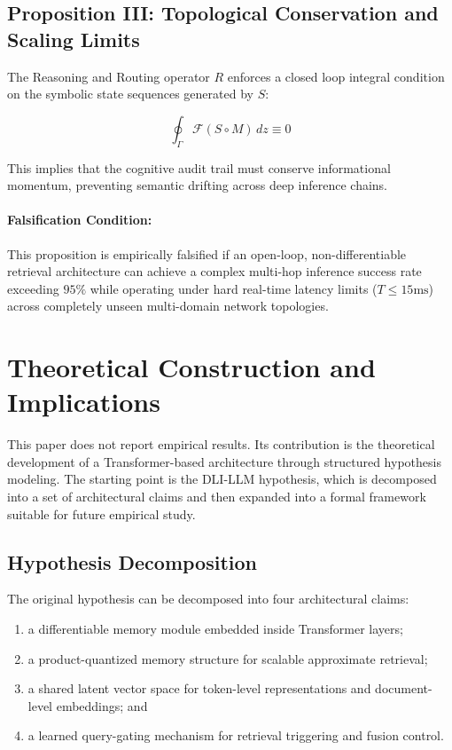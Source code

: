 \subsection{Proposition III: Topological Conservation and Scaling Limits}

The Reasoning and Routing operator $R$ enforces a closed loop integral condition on the symbolic state sequences generated by $S$:

\begin{equation}
\oint_{\Gamma} \mathcal{F}\left(S \circ M\right) \, dz \equiv 0
\end{equation}

This implies that the cognitive audit trail must conserve informational momentum, preventing semantic drifting across deep inference chains.
\paragraph{Falsification Condition:} This proposition is empirically falsified if an open-loop, non-differentiable retrieval architecture can achieve a complex multi-hop inference success rate exceeding $95\%$ while operating under hard real-time latency limits ($T \le 15\text{ms}$) across completely unseen multi-domain network topologies.

\section{Theoretical Construction and Implications}
This paper does not report empirical results. Its contribution is the theoretical development of a Transformer-based architecture through structured hypothesis modeling. The starting point is the DLI-LLM hypothesis, which is decomposed into a set of architectural claims and then expanded into a formal framework suitable for future empirical study.

\subsection{Hypothesis Decomposition}
The original hypothesis can be decomposed into four architectural claims:

\begin{enumerate}
    \item a differentiable memory module embedded inside Transformer layers;
    \item a product-quantized memory structure for scalable approximate retrieval;
    \item a shared latent vector space for token-level representations and document-level embeddings; and
    \item a learned query-gating mechanism for retrieval triggering and fusion control.
\end{enumerate}

